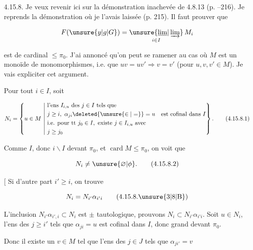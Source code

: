 
4.15.8. Je veux revenir ici sur la démonstration inachevée de 4.8.13 (p. --216). Je reprends la démonstration où  je l'avais laissée (p. 215). Il faut prouver que

\[F(\unsure{y|g|G})=\mathop{\unsure{\underline{\lim}|\varinjlim}}\limits_{i\in I}M_i\]

est de cardinal $\leq\pi_0$. J'ai annoncé qu'on peut se ramener au cas où $M$ est un monoïde de monomorphismes, i.e. que $uv=uv'\Longrightarrow v=v'$ (pour $u,v,v'\in M$). Je vais expliciter cet argument.

Pour tout $i\in I$, soit

\begingroup\makeatletter\tagsleft@true\makeatother
\[N_i=\left\{u\in M\ \middle|\ \begin{aligned}&\text{l'ens }I_{i,u}\text{ des }j\in I\text{ tels que}\\ &j\geq i,\ \alpha_{ji}\deleted{\unsure{\in|=}}=u\quad\text{est cofinal dans }I\\ &\text{i.e. pour tt }j_0\in I,\ \text{existe }j\in I_{i,u}\text{ avec}\\ &j\geq j_0\end{aligned}\right\}.\tag*{(4.15.8.1)}\]
\endgroup

Comme $I$, donc $i\backslash I$  devant $\pi_0$, et $\operatorname{card} M\leq\pi_0$, on voit  que

\begingroup\makeatletter\tagsleft@true\makeatother
\[N_i\ne\unsure{\varnothing|\phi}.\tag*{(4.15.8.2)}\]
\endgroup

[ Si d'autre part $i'\geq i$, on trouve

\begingroup\makeatletter\tagsleft@true\makeatother
\[N_i=N_{i'}\alpha_{i'i}\tag*{(4.15.8.\unsure{3|8|B})}\]
\endgroup

L'inclusion $N_{i'}\alpha_{i',i}\subset N_i$ est $\pm$ tautologique,  prouvons $N_i\subset N_{i'}\alpha_{i'i}$. Soit $u\in N_i$, l'ens  des $j\geq i'$ tels que $\alpha_{ji}=u$ est cofinal dans $I$, donc grand devant $\pi_0$.


 Donc il existe un $v\in M$ tel que l'ens  des $j\in J$ tels que $\alpha_{ji'}=v$
